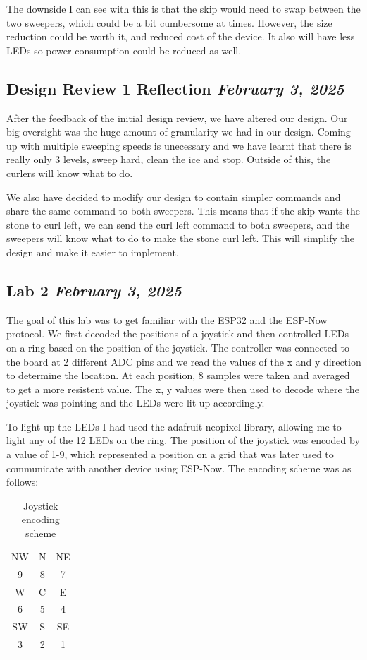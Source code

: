 \documentclass{article}
\newcommand{\logbookentry}[2]{
    \subsection*{#1 \hfill \textit{#2}} 
}
\begin{document}
The downside I can see with this is that the skip would need to swap between the two sweepers, which could be a bit cumbersome at times. However, the size reduction could be worth it, and reduced cost of the device. It also will have less LEDs so power consumption could be reduced as well.

\logbookentry{Design Review 1 Reflection}{February 3, 2025}
After the feedback of the initial design review, we have altered our design. Our big oversight was the huge amount of granularity we had in our design. Coming up with multiple sweeping speeds is unecessary and we have learnt that there is really only 3 levels, sweep hard, clean the ice and stop. Outside of this, the curlers will know what to do.

We also have decided to modify our design to contain simpler commands and share the same command to both sweepers. This means that if the skip wants the stone to curl left, we can send the curl left command to both sweepers, and the sweepers will know what to do to make the stone curl left. This will simplify the design and make it easier to implement.

\logbookentry{Lab 2}{February 3, 2025}
The goal of this lab was to get familiar with the ESP32 and the ESP-Now protocol.
We first decoded the positions of a joystick and then controlled LEDs on a ring based on the position of the joystick. The controller was connected to the board at 2 different ADC pins and we read the values of the x and y direction to determine the location. At each position, 8 samples were taken and averaged to get a more resistent value. The x, y values were then used to decode where the joystick was pointing and the LEDs were lit up accordingly.

To light up the LEDs I had used the adafruit neopixel library, allowing me to light any of the 12 LEDs on the ring. The position of the joystick was encoded by a value of 1-9, which represented a position on a grid that was later used to communicate with another device using ESP-Now. The encoding scheme was as follows:
\begin{table}[ht!]
    \centering
    \begin{tabular}{|c|c|c|}
        \hline
        NW & N & NE \\
        9 & 8 & 7 \\
        \hline 
        W & C & E \\
        6 & 5 & 4 \\
        \hline
        SW & S & SE \\
        3 & 2 & 1 \\
        \hline
    \end{tabular}
    \caption{Joystick encoding scheme}
\end{table}
\end{document}
